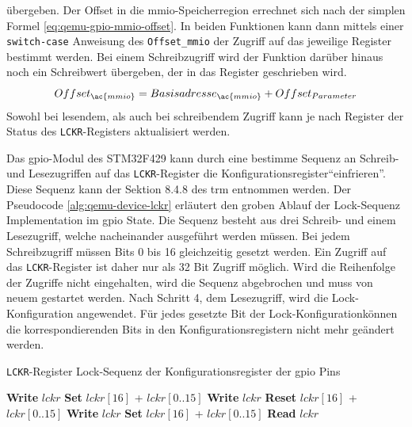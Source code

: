 übergeben.
Der Offset in die \ac{mmio}-Speicherregion errechnet sich nach der simplen Formel
\ref{eq:qemu-gpio-mmio-offset}.
In beiden Funktionen kann dann mittels einer \texttt{switch-case} Anweisung des
\texttt{Offset\_\ac{mmio}} der Zugriff auf das jeweilige Register bestimmt
werden.
Bei einem Schreibzugriff wird der Funktion darüber hinaus noch ein Schreibwert
übergeben, der in das Register geschrieben wird.
\begin{equation}
    Offset_{\ac{mmio}} = Basisadresse_{\ac{mmio}} + Offset_{Parameter}
    \label{eq:qemu-gpio-mmio-offset}
\end{equation}
Sowohl bei lesendem, als auch bei schreibendem Zugriff kann je nach Register
der Status des \texttt{LCKR}-Registers aktualisiert werden.

Das \ac{gpio}-Modul des STM32F429 kann durch eine bestimme Sequenz an Schreib- und
Lesezugriffen auf das \texttt{LCKR}-Register die
Konfigurationsregister\footnotemark[4] \enquote{einfrieren}.
Diese Sequenz kann der Sektion 8.4.8 des \ac{trm} entnommen werden\cite{Stm32F4Trm}.
Der Pseudocode \ref{alg:qemu-device-lckr} erläutert den groben Ablauf der
Lock-Sequenz Implementation im \ac{gpio} State.
Die Sequenz besteht aus drei Schreib- und einem Lesezugriff, welche
nacheinander ausgeführt werden müssen.
Bei jedem Schreibzugriff müssen Bits 0 bis 16 gleichzeitig gesetzt werden.
Ein Zugriff auf das \texttt{LCKR}-Register ist daher nur als 32 Bit Zugriff
möglich.
Wird die Reihenfolge der Zugriffe nicht eingehalten, wird die Sequenz
abgebrochen und muss von neuem gestartet werden.
Nach Schritt 4, dem Lesezugriff, wird die Lock-Konfiguration angewendet.
Für jedes gesetzte Bit der Lock-Konfiguration\footnotemark[5] können die
korrespondierenden Bits in den Konfigurationsregistern nicht mehr geändert
werden.
\begin{algorithm}
    \caption{\texttt{LCKR}-Register Lock-Sequenz der Konfigurationsregister der
            \ac{gpio} Pins}
    \label{alg:qemu-device-lckr}
    \begin{algorithmic}[1]
        \State \textbf{Write} $lckr$ \gets \textbf{Set} $lckr[16]$ + $lckr[0..15]$
        \State \textbf{Write} $lckr$ \gets \textbf{Reset} $lckr[16]$ + $lckr[0..15]$
        \State \textbf{Write} $lckr$ \gets \textbf{Set} $lckr[16]$ + $lckr[0..15]$
        \State \textbf{Read} $lckr$
    \end{algorithmic}
\end{algorithm}

